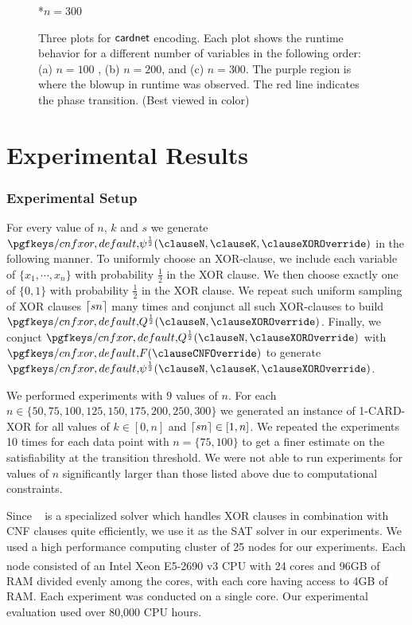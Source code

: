 \begin{figure}
\begin{multicols}{3}
		*{$n=300$}
	\end{multicols}
	\caption{Three plots for ${\sf cardnet}$ encoding. Each plot shows the runtime behavior for a different number of variables in the following order: (a) $n=100$ , (b) $n=200$, and (c) $n=300$. The purple region is where the blowup in runtime was observed. The red line indicates the phase transition. (Best viewed in color) \label{fig:ncomp}}
\end{figure}
\section{Experimental Results} \label{sec:experiments}
\subsubsection{Experimental Setup}
 \label{sec:experiments:scaling:setup}
For every value of $n$, $k$ and $s$ we generate $\FQ$ in the following manner. To uniformly choose an XOR-clause, we include each variable of $\{x_1,\cdots,x_n\}$ with probability $\frac{1}{2}$ in the XOR clause. We then choose exactly one of $\{0,1\}$ with probability $\frac{1}{2}$ in the XOR clause. We repeat such uniform sampling of XOR clauses $\left\lceil sn\right\rceil$ many times and conjunct all such XOR-clauses to build $\Q$. Finally, we conjuct $\Q$ with $\F$ to generate $\FQ$. 

We performed experiments with $9$ values of $n$. For each $n\in \{ 50,75,100,125,150,175,200,250,300\}$ we generated an instance of 1-CARD-XOR for all values of $k \in [0,n]$ and $\left\lceil sn\right\rceil \in [1,n]$. We repeated the experiments 10 times for each data point with $n=\{75,100\}$ to get a finer estimate on the satisfiability at the transition threshold. We were not able to run experiments for values of $n$ significantly larger than those listed above due to computational constraints.

Since \CryptoMiniSAT~\cite{SNC09} is a specialized solver which handles XOR clauses in combination with CNF clauses quite efficiently, we use it as the SAT solver in our experiments. We used a high performance computing cluster of 25 nodes for our experiments. Each node consisted of an Intel\textsuperscript{\textregistered} Xeon\textsuperscript{\textregistered} E5-2690 v3 CPU with 24 cores and 96GB of RAM divided evenly among the cores, with each core having access to 4GB of RAM. Each experiment was conducted on a single core. Our experimental evaluation used over 80,000 CPU hours. 


